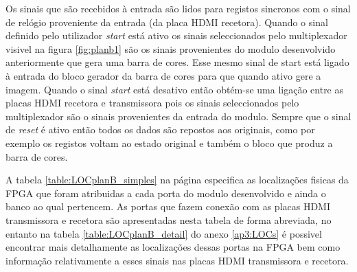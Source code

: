 Os sinais que são recebidos à entrada são lidos para registos sincronos com o sinal de relógio proveniente da entrada (da placa HDMI recetora). Quando o sinal definido pelo utilizador \textit{start} está ativo os sinais seleccionados pelo multiplexador visivel na figura \ref{fig:planb1} são os sinais provenientes do modulo desenvolvido anteriormente que gera uma barra de cores. Esse mesmo sinal de start está ligado à entrada do bloco gerador da barra de cores para que quando ativo gere a imagem. Quando o sinal \textit{start} está desativo então obtém-se uma ligação entre as placas HDMI recetora e transmissora pois os sinais seleccionados pelo multiplexador são o sinais provenientes da entrada do modulo. Sempre que o sinal de \textit{reset} é ativo então todos os dados são repostos aos originais, como por exemplo os registos voltam ao estado original e também o bloco que produz a barra de cores.

A tabela \ref{table:LOCplanB_simples} na página \pageref{table:LOCplanB_simples} especifica as localizações fisicas da FPGA que foram atribuidas a cada porta do modulo desenvolvido e ainda o banco ao qual pertencem. As portas que fazem conexão com as placas HDMI transmissora e recetora são apresentadas nesta tabela de forma abreviada, no entanto na tabela \ref{table:LOCplanB_detail} do anexo \ref{ap3:LOCs} é possivel encontrar mais detalhamente as localizações dessas portas na FPGA bem como informação relativamente a esses sinais nas placas HDMI transmissora e recetora.

